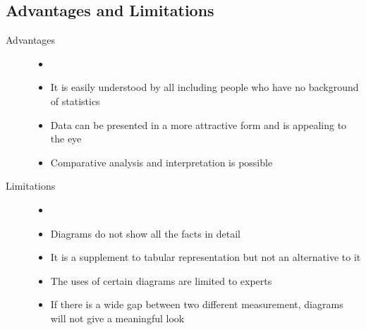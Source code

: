 \documentclass[
10pt, %
a4paper, %
]{report}
\begin{document}
\subsection{Advantages and Limitations}
\begin{description}
\item[Advantages]
\begin{itemize}
\item[]
\item It is easily understood by all including people who have no background of statistics
\item Data can be presented in a more attractive form and is appealing to the eye
\item Comparative analysis and interpretation is possible
\end{itemize}
\item[Limitations]
\begin{itemize}
\item[]
\item Diagrams do not show all the facts in detail
\item It is a supplement to tabular representation but not an alternative to it
\item The uses of certain diagrams are limited to
experts
\item If there is a wide gap between two different measurement, diagrams will not give a
meaningful look
\end{itemize}
\end{description}
\end{document}
